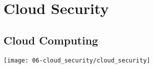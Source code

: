 

\section{Cloud Security}

\subsection{Cloud Computing}
\begin{center}
    \texttt{[image: 06-cloud\_security/cloud\_security]}
    \vspace{-8pt}
\end{center}

